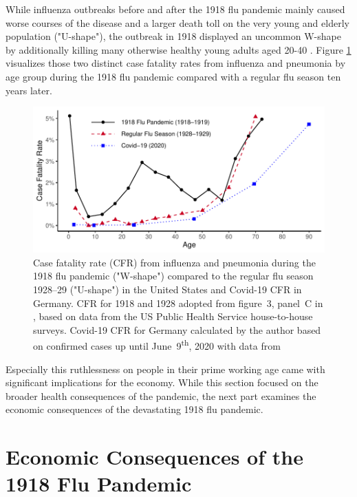 \documentclass[12pt,a4paper]{article}
\begin{document}
While influenza outbreaks before and after the 1918 flu pandemic mainly caused worse courses of the disease and a larger death toll on the very young and elderly population ("U-shape"),
the outbreak in 1918 displayed an uncommon W-shape by additionally killing many otherwise healthy young adults aged 20-40 \citep{taubenberger1918InfluenzaMother2006}.
Figure \ref{fig_cfr} visualizes those two distinct case fatality rates from influenza and pneumonia by age group during the 1918 flu pandemic compared with a regular flu season ten years later.

\begin{figure}[ht]
	\centering
	\includegraphics[]{plots/cfr.pdf}
	\caption[Case Fatality Rate from Influenza and Pneumonia by Age During the 1918 Flu Pandemic Compared to the Regular Flu Season 1928--29 and Covid-19 (2020)]{Case fatality rate (CFR) from influenza and pneumonia during the 1918 flu pandemic ("W-shape") compared to the regular flu season 1928--29 ("U-shape") in the United States and Covid-19 CFR in Germany.
	CFR for 1918 and 1928 adopted from figure~3, panel~C in \cite{taubenberger1918InfluenzaMother2006}, based on data from the US Public Health Service house-to-house surveys.
	Covid-19 CFR for Germany calculated by the author based on confirmed cases up until June~9\textsuperscript{th}, 2020 with data from \cite{robertkochinstituteCovid19CasesJune2020}}
	\label{fig_cfr}
\end{figure}

Especially this ruthlessness on people in their prime working age came with significant implications for the economy.
While this section focused on the broader health consequences of the pandemic, the next part examines the economic consequences of the devastating 1918 flu pandemic.

\section{Economic Consequences of the 1918 Flu Pandemic}
\end{document}
